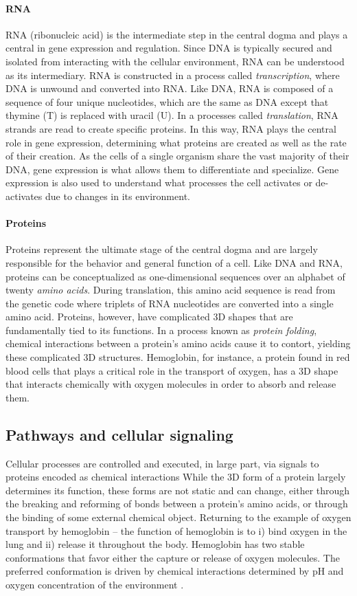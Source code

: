 \paragraph{RNA} RNA (ribonucleic acid) is the intermediate step in the central dogma and plays a central in gene expression and regulation.
Since DNA is typically secured and isolated from interacting with the cellular environment, RNA can be understood as its intermediary.
RNA is constructed in a process called \emph{transcription}, where DNA is unwound and converted into RNA.
Like DNA, RNA is composed of a sequence of four unique nucleotides, which are the same as DNA except that thymine (T) is replaced with uracil (U).
In a processes called \emph{translation}, RNA strands are read to create specific proteins.
In this way, RNA plays the central role in gene expression, determining what proteins are created as well as the rate of their creation.
As the cells of a single organism share the vast majority of their DNA, 
gene expression is what allows them to differentiate and specialize.
Gene expression is also used to understand what processes the cell activates or de-activates due to changes in its environment.

\paragraph{Proteins} Proteins represent the ultimate stage of the central dogma and are largely responsible for the behavior and general function of a cell.
Like DNA and RNA, proteins can be conceptualized as one-dimensional sequences over an alphabet of twenty \emph{amino acids}.
During translation, this amino acid sequence is read from the genetic code where triplets of RNA nucleotides are converted into a single amino acid.
Proteins, however, have complicated 3D shapes that are fundamentally tied to its functions.
In a process known as \emph{protein folding}, chemical interactions between a protein's amino acids cause it to contort, yielding these complicated 3D structures.
Hemoglobin, for instance, a protein found in red blood cells that plays a critical role in the transport of oxygen, has a 3D shape that interacts chemically with oxygen molecules in order to absorb and release them.

\subsection{Pathways and cellular signaling}
Cellular processes are controlled and executed, in large part, via signals to proteins encoded as chemical interactions
While the 3D form of a protein largely determines its function,
these forms are not static and can change,
either through the breaking and reforming of bonds between a protein's amino acids,
or through the binding of some external chemical object.
Returning to the example of oxygen transport by hemoglobin -- the function of hemoglobin is to i) bind oxygen in the lung and ii) release it throughout the body.
Hemoglobin has two stable conformations that favor either the capture or release of oxygen molecules.
The preferred conformation is driven by chemical interactions determined by pH and oxygen concentration of the environment \cite{bohreffect}.

